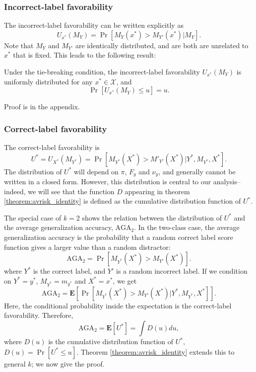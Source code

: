 \documentclass[twoside,11pt]{article}
\newcommand{\E}{\textbf{E}}
\begin{document}
\subsubsection{Incorrect-label favorability}
The incorrect-label favorability can be written explicitly as
\begin{equation}
U_{x^*}(M_Y) = \Pr[M_{Y}(x^*) > M_{Y'}(x^*)|M_{Y}].
\end{equation}
Note that $M_Y$ and $M_{Y'}$ are identically distributed, and are both
are unrelated to $x^*$ that is fixed. This leads to the following
result:
\begin{lemma}\label{lemma:U_function}
Under the tie-breaking condition, the incorrect-label favorability
$U_{x^*}(M_Y)$ is uniformly distributed for any $x^* \in \mathcal{X}$,
and \begin{equation}\label{eq:Uniform} \Pr[U_{x^*}(M_Y) \leq u] = u.
\end{equation}
\end{lemma}
Proof is in the appendix. 

\subsubsection{Correct-label favorability}

The correct-label favorability is 
\begin{equation}
U^* = U_{X^*}(M_{Y^*}) = \Pr[M_{Y^*}(X^*) > M'_{Y'}(X^*)|Y^*,M_{Y^*},X^*].
\end{equation}
The distribution of $U^*$ will depend on $\pi$, $F_y$ and $\nu_y$, and
generally cannot be written in a closed form.  However, this
distribution is central to our analysis--indeed, we will see that the
function ${D}$ appearing in theorem \ref{theorem:avrisk_identity}
is defined as the cumulative distribution function of $U^*$.

The special case of $k=2$ shows the relation between the distribution
of $U^*$ and the average generalization accuracy, $\text{AGA}_2$. In
the two-class case, the average generalization accuracy is the
probability that a random correct label score function gives a larger
value than a random distractor:
\[
\text{AGA}_2 = \Pr[M_{Y^*}(X^*) > M_{Y'}(X^*)].
\]
where $Y^*$ is the correct label, and $Y'$ is a random incorrect
label.  If we condition on $Y^* = y^*$, $M_{Y^*} = m_{y^*}$ and $X^* =
x^*$, we get
\[
\text{AGA}_2 = \E[\Pr[M_{Y^*}(X^*) > M_{Y'}(X^*)|Y^*, M_{Y^*}, X^*]].
\]
Here, the conditional probability inside the expectation is the
correct-label favorability.  Therefore,
\[
\text{AGA}_2 = \E[U^*] = \int {D}(u) du,
\]
where ${D}(u)$ is the cumulative distribution function of $U^*$,
${D}(u) = \Pr[U^* \leq u]$.  Theorem \ref{theorem:avrisk_identity}
extends this to general $k$; we now give the proof.\newline
\end{document}
